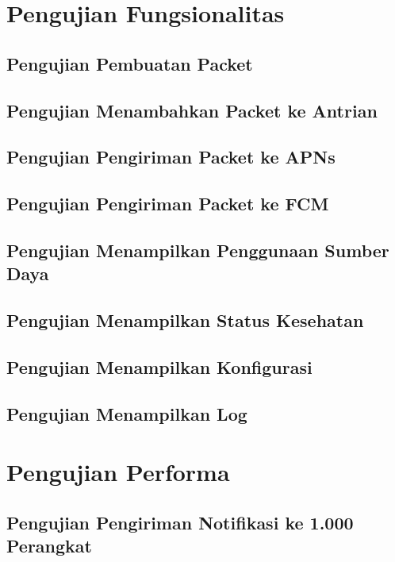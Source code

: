 \section{Pengujian Fungsionalitas}

\subsection{Pengujian Pembuatan Packet}

\subsection{Pengujian Menambahkan Packet ke Antrian}

\subsection{Pengujian Pengiriman Packet ke APNs}

\subsection{Pengujian Pengiriman Packet ke FCM}

\subsection{Pengujian Menampilkan Penggunaan Sumber Daya}

\subsection{Pengujian Menampilkan Status Kesehatan}

\subsection{Pengujian Menampilkan Konfigurasi}

\subsection{Pengujian Menampilkan Log}

\section{Pengujian Performa}

\subsection{Pengujian Pengiriman Notifikasi ke 1.000 Perangkat}

